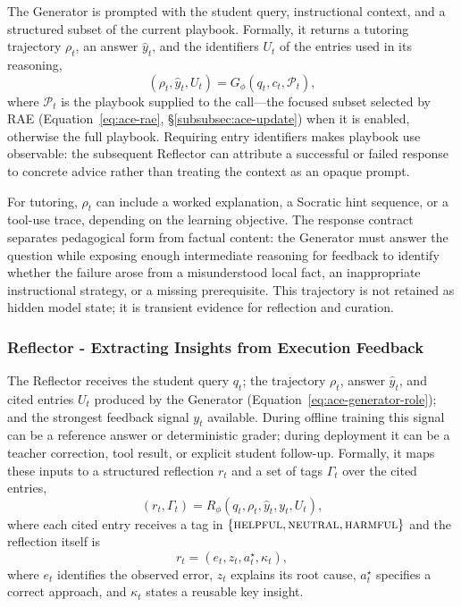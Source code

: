 \documentclass[10pt,conference]{IEEEtran}
\begin{document}
The Generator is prompted with the student query, instructional
context, and a structured subset of the current playbook. Formally, it
returns a tutoring trajectory $\rho_t$, an answer $\hat y_t$, and the
identifiers $U_t$ of the entries used in its reasoning,
\begin{equation}
    (\rho_t,\hat{y}_t,U_t) = G_\phi(q_t,c_t,\mathcal{P}_t),
    \label{eq:ace-generator-role}
\end{equation}
where $\mathcal{P}_t$ is the playbook supplied to the call---the focused
subset selected by RAE (Equation~\eqref{eq:ace-rae},
§\ref{subsubsec:ace-update}) when it is enabled, otherwise the full
playbook. Requiring entry
identifiers makes playbook use observable: the subsequent Reflector can
attribute a successful or failed response to concrete advice rather
than treating the context as an opaque prompt.

For tutoring, $\rho_t$ can include a worked explanation, a Socratic 
hint sequence, or a tool-use trace, depending on the learning objective. 
The response contract separates pedagogical form from factual content: 
the Generator must answer the question while exposing enough intermediate 
reasoning for feedback to identify whether the failure arose from a 
misunderstood local fact, an inappropriate instructional strategy, or a 
missing prerequisite. This trajectory is not retained as hidden model 
state; it is transient evidence for reflection and curation.

\subsubsection{Reflector - Extracting Insights from Execution Feedback}
\label{subsubsec:ace-reflector}

The Reflector receives the student query $q_t$; the trajectory $\rho_t$,
answer $\hat y_t$, and cited entries $U_t$ produced by the Generator
(Equation~\eqref{eq:ace-generator-role}); and the strongest feedback
signal $y_t$ available. During
offline training this signal can be a reference answer or deterministic
grader; during deployment it can be a teacher correction, tool result,
or explicit student follow-up. Formally, it maps these inputs to a
structured reflection $r_t$ and a set of tags $\Gamma_t$ over the cited
entries,
\begin{equation}
    (r_t,\Gamma_t) = R_\phi(q_t,\rho_t,\hat{y}_t,y_t,U_t),
    \label{eq:ace-reflector-role}
\end{equation}
where each cited entry receives a tag in
$\{\textsc{helpful},\textsc{neutral},\textsc{harmful}\}$ and the
reflection itself is
\begin{equation}
    r_t=(e_t,z_t,a_t^{\star},\kappa_t),
    \label{eq:ace-reflection}
\end{equation}
where $e_t$ identifies the observed error, $z_t$ explains its root
cause, $a_t^{\star}$ specifies a correct approach, and $\kappa_t$ states a
reusable key insight.
\end{document}
